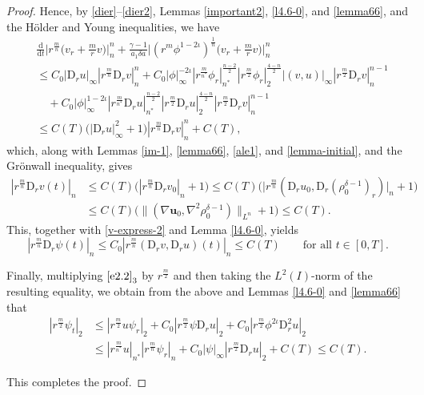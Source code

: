 \documentclass[11pt,reqno]{amsart}
\numberwithin{rk}{section}
\numberwithin{prop}{section}
\numberwithin{mydef}{section}
\numberwithin{lem}{section}
\numberwithin{equation}{section}
\numberwithin{thm}{section}
\begin{document}
\begin{proof}
Hence, by \eqref{dier}--\eqref{dier2}, Lemmas \ref{important2}, \ref{l4.6-0}, and \ref{lemma66}, and the H\"older and Young inequalities, we have
\begin{equation*} 
\begin{aligned}
&\frac{\mathrm{d}}{\mathrm{d}t}\Big|r^{\frac{m}{n}}\big(v_r+\frac{m}{r}v\big)\Big|_{n}^{n}+\frac{\gamma-1}{a_1\delta a}\Big|(r^m\phi^{1-2\iota})^\frac{1}{n}\big(v_r+\frac{m}{r}v\big)\Big|_{n}^{n}\\
&\leq C_0 |\mathrm{D}_r u|_\infty |r^\frac{m}{n}\mathrm{D}_rv|_{n}^n +C_0|\phi|_\infty^{-2\iota} |r^\frac{m}{n^*}\phi_r|_{n^*}^\frac{n-2}{2} |r^\frac{m}{2}\phi_r|_{2}^\frac{4-n}{2}|(v,u)|_\infty |r^\frac{m}{2}\mathrm{D}_r v|_{n}^{n-1}\\
&\quad +C_0|\phi|_\infty^{1-2\iota} |r^\frac{m}{n^*}\mathrm{D}_r u|_{n^*}^\frac{n-2}{2} |r^\frac{m}{2}\mathrm{D}_r u|_{2}^\frac{4-n}{2} |r^\frac{m}{2}\mathrm{D}_r v|_{n}^{n-1}\\
&\leq C(T) \big(|\mathrm{D}_r u|_\infty^2+1\big)|r^\frac{m}{n}\mathrm{D}_r v|_{n}^{n}+C(T),
\end{aligned}    
\end{equation*}
which, along with Lemmas \ref{im-1}, \ref{lemma66}, \ref{ale1}, and \ref{lemma-initial}, and the Gr\"onwall inequality, gives
\begin{equation*}
\begin{aligned}
|r^\frac{m}{n}\mathrm{D}_r v(t)|_{n}&\leq C(T)\big(|r^\frac{m}{n}\mathrm{D}_r v_0|_{n}+1\big) \leq C(T)\big(\big|r^\frac{m}{n} (\mathrm{D}_r u_0,\mathrm{D}_r(\rho_0^{\delta-1})_r)\big|_{n}+1\big)\\
&\leq C(T)\big(\|(\nabla \boldsymbol{u}_0,\nabla^2 \rho_0^{\delta-1})\|_{L^{n}}+1\big)\leq C(T).
\end{aligned}  
\end{equation*}
This, together with \eqref{v-express-2} and Lemma \ref{l4.6-0}, yields 
\begin{equation*}
|r^\frac{m}{n}\mathrm{D}_r \psi(t)|_{n}\leq C_0 |r^\frac{m}{n}(\mathrm{D}_r v,\mathrm{D}_r u)(t)|_{n}\leq C(T)\qquad\text{for all $t\in [0,T]$}.
\end{equation*}

Finally, multiplying $\eqref{e2.2}_3$ by $r^\frac{m}{2}$ and then taking the $L^2(I)$-norm of the resulting equality, we obtain from the above and Lemmas \ref{l4.6-0} and \ref{lemma66} that
\begin{equation*} 
\begin{aligned}
|r^{\frac{m}{2}}\psi_t|_2&\leq  |r^{\frac{m}{2}}u\psi_r|_2+C_0 |r^\frac{m}{2} \psi\mathrm{D}_r u|_2+C_0 |r^{\frac{m}{2}}\phi^{2\iota}\mathrm{D}_r^2 u|_2 \\
&\leq  |r^{\frac{m}{n^*}}u|_{n^*}|r^{\frac{m}{n}}\psi_r|_n+C_0 |\psi|_\infty|r^{\frac{m}{2}}\mathrm{D}_r u|_2+C(T) \leq C(T).
\end{aligned}
\end{equation*}

This completes the proof. 
\end{proof}
\end{document}
